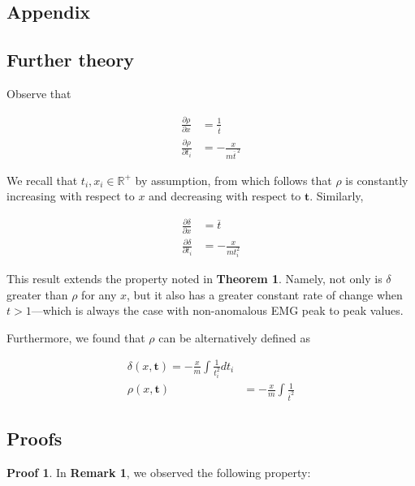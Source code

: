 \documentclass{article}
\begin{document}
\pagebreak

\begin{multicols}{2}

\section{Appendix}

\subsection{Further theory}

Observe that

\begin{align*}
    \frac{\partial \rho}{\partial x } &= \frac{1}{\overline{t}}  \\ 
     \frac{\partial \rho}{\partial t_i} &= -\frac{x}{m\overline{t}^{~ 2}}
\end{align*}

We recall that $t_i, x_i \in \mathbb{R}^{+}$ by assumption, from which follows
that $\rho$ is constantly increasing with respect to $x$ and
decreasing with respect to $\textbf{t}$. Similarly,

\begin{align*} 
    \frac{\partial \delta}{\partial x} &= \overline{t}\\ 
    \frac{\partial \delta}{\partial t_i} &= -\frac{x}{mt_i^2}
\end{align*}

This result extends the property noted in \textbf{Theorem 1}. Namely, not only
is $\delta$ greater than $\rho$ for any $x$, but it also has a greater constant
rate of change when $t > 1$---which is always the case with non-anomalous EMG
peak to peak values.

Furthermore, we found that $\rho$ can be alternatively defined as 

\begin{align*}
    \delta(x, \textbf{t}) = -\frac{x}{m}\int \frac{1}{t_i^2} dt_i \\ 
    \rho(x, \textbf{t}) &= -\frac{x}{m}\int \frac{1}{\overline{t}^2}
\end{align*}

\subsection{Proofs}

\textbf{Proof 1}. In \textbf{Remark 1}, we observed the following property:


\end{multicols}
\end{document}
